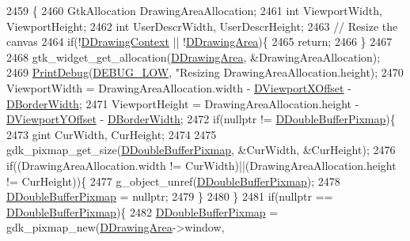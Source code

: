 \begin{DoxyCode}
2459                                      \{
2460     GtkAllocation DrawingAreaAllocation;
2461     \textcolor{keywordtype}{int} ViewportWidth, ViewportHeight;
2462     \textcolor{keywordtype}{int} UserDescrWidth, UserDescrHeight;
2463     \textcolor{comment}{// Resize the canvas}
2464     \textcolor{keywordflow}{if}(!\hyperlink{classCApplicationData_aa6c5bea9bdcc64398e5a3f693661d37c}{DDrawingContext} || !\hyperlink{classCApplicationData_a4735f5d31632313e0b2a1659eb178987}{DDrawingArea})\{
2465         \textcolor{keywordflow}{return};    
2466     \}
2467     
2468     gtk\_widget\_get\_allocation(\hyperlink{classCApplicationData_a4735f5d31632313e0b2a1659eb178987}{DDrawingArea}, &DrawingAreaAllocation);
2469     \hyperlink{Debug_8h_aa5f00f5537c9760f6ae1782460748ab9}{PrintDebug}(\hyperlink{Debug_8h_a3a5f3fc09784650d8388cb854882f840}{DEBUG\_LOW}, \textcolor{stringliteral}{"Resizing %
      DrawingAreaAllocation.height);
2470     ViewportWidth = DrawingAreaAllocation.width - \hyperlink{classCApplicationData_a306bba873ccc47126111305fe21ef3ff}{DViewportXOffset} - 
      \hyperlink{classCApplicationData_a566b69c72fa982c6ecf8e47dc21df489}{DBorderWidth};
2471     ViewportHeight = DrawingAreaAllocation.height - \hyperlink{classCApplicationData_afc58ed96a1af813b28f6abf2c7d2dc72}{DViewportYOffset} - 
      \hyperlink{classCApplicationData_a566b69c72fa982c6ecf8e47dc21df489}{DBorderWidth};
2472     \textcolor{keywordflow}{if}(\textcolor{keyword}{nullptr} != \hyperlink{classCApplicationData_aefb64ec5ca3f791f6d431cfc56b9f3b3}{DDoubleBufferPixmap})\{
2473         gint CurWidth, CurHeight;
2474         
2475         gdk\_pixmap\_get\_size(\hyperlink{classCApplicationData_aefb64ec5ca3f791f6d431cfc56b9f3b3}{DDoubleBufferPixmap}, &CurWidth, &CurHeight); 
2476         \textcolor{keywordflow}{if}((DrawingAreaAllocation.width != CurWidth)||(DrawingAreaAllocation.height != CurHeight))\{
2477             g\_object\_unref(\hyperlink{classCApplicationData_aefb64ec5ca3f791f6d431cfc56b9f3b3}{DDoubleBufferPixmap});
2478             \hyperlink{classCApplicationData_aefb64ec5ca3f791f6d431cfc56b9f3b3}{DDoubleBufferPixmap} = \textcolor{keyword}{nullptr};
2479         \}
2480     \}
2481     \textcolor{keywordflow}{if}(\textcolor{keyword}{nullptr} == \hyperlink{classCApplicationData_aefb64ec5ca3f791f6d431cfc56b9f3b3}{DDoubleBufferPixmap})\{
2482         \hyperlink{classCApplicationData_aefb64ec5ca3f791f6d431cfc56b9f3b3}{DDoubleBufferPixmap} = gdk\_pixmap\_new(\hyperlink{classCApplicationData_a4735f5d31632313e0b2a1659eb178987}{DDrawingArea}->window, 
}
\end{DoxyCode}
